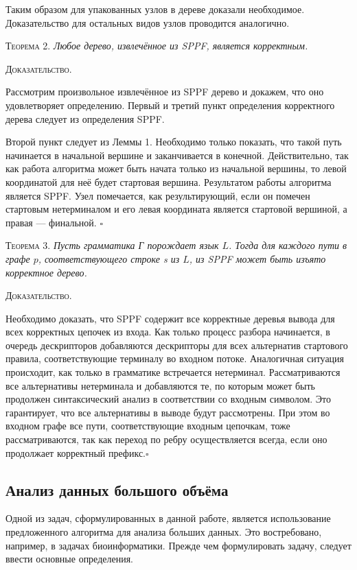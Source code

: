 Таким образом для упакованных узлов в дереве доказали необходимое. Доказательство для остальных видов узлов проводится аналогично.

\textsc{Теорема 2.} 
\textit{Любое дерево, извлечённое из SPPF, является корректным.}

\textsc{Доказательство.}

Рассмотрим произвольное извлечённое из SPPF дерево и докажем, что оно удовлетворяет определению. Первый и третий пункт определения корректного дерева следует из определения SPPF. 

Второй пункт следует из Леммы 1. Необходимо только показать, что такой путь начинается в начальной вершине и заканчивается в конечной. Действительно, так как работа алгоритма может быть начата только из начальной вершины, то левой координатой для неё будет стартовая вершина. Результатом работы алгоритма является SPPF. Узел помечается, как результирующий, если он помечен стартовым нетерминалом и его левая координата является стартовой вершиной, а правая --- финальной. $\square$

\textsc{Теорема 3.} 
\textit{Пусть грамматика Г порождает язык $L$. Тогда для каждого пути в графе $p$, соответствующего строке s из $L$, из SPPF может быть изъято корректное дерево.}

\textsc{Доказательство.}

Необходимо доказать, что SPPF содержит все корректные деревья вывода для всех корректных цепочек из входа. Как только процесс разбора начинается, в очередь дескрипторов добавляются дескрипторы для всех альтернатив стартового правила, соответствующие терминалу во входном потоке. Аналогичная ситуация происходит, как только в грамматике встречается нетерминал. Рассматриваются все альтернативы нетерминала и добавляются те, по которым может быть продолжен синтаксический анализ в соответствии со входным символом. Это гарантирует, что все альтернативы в выводе будут рассмотрены. При этом во входном графе все пути, соответствующие входным цепочкам, тоже рассматриваются, так как переход по ребру осуществляется всегда, если оно продолжает корректный префикс.$\square$

\subsection{Анализ данных большого объёма}
Одной из задач, сформулированных в данной работе, является использование предложенного алгоритма для анализа больших данных. Это востребовано, например, в задачах биоинформатики. Прежде чем формулировать задачу, следует ввести основные определения.

